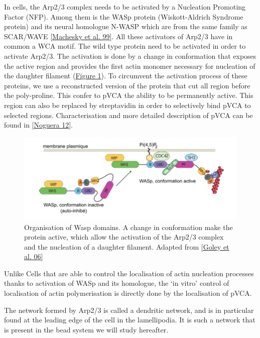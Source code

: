 \documentclass[A4paperpaper,11pt,english]{sphinxmanual}
\begin{document}
In cells, the Arp2/3 complex needs to be activated by a Nucleation Promoting
Factor (NFP).  Among them is the  WASp protein (Wiskott-Aldrich Syndrome
protein) and its neural homologue N-WASP which are from the same family as
SCAR/WAVE {\hyperref[index-latex:machesky1999]{{[}Machesky et al. 99{]}}}.  All these activators of Arp2/3 have in common a
WCA motif. The wild type protein need to be activated in order to activate Arp2/3.
The activation is done by a change in conformation that exposes the active
region and provides the first actin monomer necessary for nucleation of the
daughter filament (\hyperref[index-latex:fig-pwa-deploy]{Figure  \ref*{index-latex:fig-pwa-deploy}}).  To circumvent the activation process of
these proteins, we use a reconstructed version of the protein that cut all
region before the poly-proline. This confer to pVCA the ability to be
permanently active. This region can also be replaced by streptavidin in order
to selectively bind pVCA to selected regions. Characterisation and more
detailed description of pVCA can be found in {\hyperref[index-latex:noguera2012]{{[}Noguera 12{]}}}.
\begin{figure}[htbp]
\centering
\capstart

\includegraphics[width=0.600\linewidth]{pwa-deploy.png}
\caption{Organisation of Wasp domains. A change in conformation make the protein
active, which allow the activation of the Arp2/3 complex and the nucleation
of a daughter filament.  Adapted from {\hyperref[index-latex:goley2006]{{[}Goley et al. 06{]}}}}\label{index-latex:fig-pwa-deploy}\end{figure}

Unlike Cells that are able to control the localisation of actin nucleation
processes thanks to activation of WASp and its homologue, the `in vitro' control
of localisation of actin polymerisation is directly done by the localisation of
pVCA.

The network formed by Arp2/3 is called a dendritic network, and is in
particular found at the leading edge of the cell in the lamellipodia. It is
such a network that is present in the bead system we will study hereafter.
\end{document}
